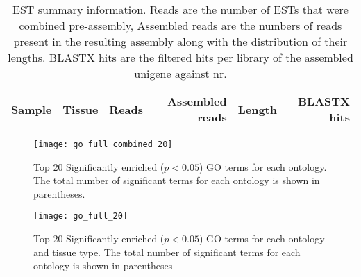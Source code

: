 \documentclass[11pt]{article}
\newcommand{\beginsupplement}{%
        \setcounter{table}{0}
        \renewcommand{\thetable}{S\arabic{table}}
        \setcounter{figure}{0}
        \renewcommand{\thefigure}{S\arabic{figure}}
        \renewcommand{\thesection}{S\arabic{section}}
        \renewcommand{\thesubsection}{S\arabic{subsection}} 
     }
\begin{document}
\begin{table}[t]
  \centering
  \begin{tabular}{llrrrr}
    \toprule
    Sample & Tissue & Reads & Assembled reads & Length & BLASTX hits \\
    \midrule
    \bottomrule

  \end{tabular}
  \label{tab:est}
  \caption{EST summary information. Reads are the number of ESTs that were combined pre-assembly, 
Assembled reads are the numbers of reads present in the resulting assembly along with the distribution 
of their lengths. BLASTX hits are the filtered hits per library of the assembled unigene against nr.}
  
\end{table}



\clearpage

\begin{figure}[t]
  \centering
  \texttt{[image: go\_full\_combined\_20]}
  \caption{Top 20 Significantly enriched ($p < 0.05$) GO terms for
    each ontology. The total number of significant terms for each
    ontology is shown in parentheses.}
  \label{fig:go_combined}
\end{figure}


\begin{figure}[t]
  \centering
  \texttt{[image: go\_full\_20]}
  \caption{Top 20 Significantly enriched ($p < 0.05$) GO terms for
    each ontology and tissue type. The total number of significant
    terms for each ontology is shown in parentheses}
  \label{fig:go_tissue}
\end{figure}





\end{document}
